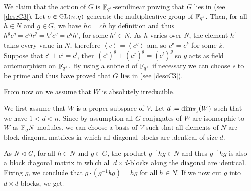 We claim that the action of $G$ is $\mathbb{F}_{q^s}$-semilinear proving that $G$ lies
in  (see \ref{descC3}). Let $c \in \GL(n,q)$ generate the
multiplicative group of $\mathbb{F}_{q^s}$. Then, for all $h \in N$ and $g
\in G$, we have $hc=ch$ by definition and thus $h^g c^g = c^g h^g =
h' c^g = c^g h'$, for some $h' \in N$. As $h$ varies over $N$, the
element $h'$ takes every value in $N$, therefore $\left< c \right>
= \left< c^g \right>$ and so $c^g = c^k$ for some $k$. Suppose that
$c^i + c^j = c^l$, then $(c^i)^g + (c^j)^g = (c^l)^g$ so $g$ acts as
field automorphism on $\mathbb{F}_{q^s}$. By using a subfield of $\mathbb{F}_{q^s}$ if
necessary we can choose $s$ to be prime and thus have proved that $G$
lies in  (see \ref{descC3}).

From now on we assume that $W$ is absolutely irreducible.

We first assume that $W$ is a proper subspace of $V$. Let $d :=
\dim_{\mathbb{F}_q}(W)$ such that we have $1 < d < n$. Since by assumption 
all $G$-conjugates of $W$ are isomorphic to $W$ as $\mathbb{F}_q N$-modules,
we can choose a basis of $V$ such that all elements of $N$ are block
diagonal matrices in which all diagonal blocks are identical of size
$d$.

As $N \triangleleft G$, for all $h \in N$ and $g \in G$,
 the product $g^{-1}hg \in N$ and thus $g^{-1} h g$ is also 
a block diagonal matrix in which all $d \times d$-blocks along the diagonal
are identical. Fixing $g$, we conclude that $g\cdot (g^{-1}hg) = hg$ for all
$h \in N$. If we now cut $g$ into $d \times d$-blocks, we get:

